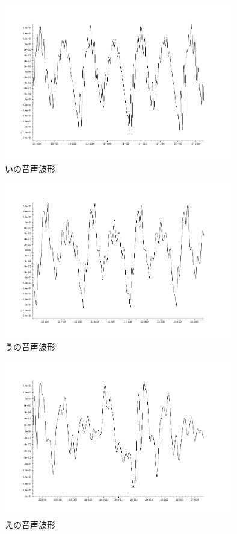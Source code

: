 \documentclass[12pt,oneside]{sotsuken_paper}
\begin{document}
\begin{figure}[htbp]
\begin{center}
\includegraphics[width=100mm]{img/i.png}
\caption{いの音声波形}
\label{fig:voice-i}
\end{center}
\end{figure}


\begin{figure}[htbp]
\begin{center}
\includegraphics[width=100mm]{img/u.png}
\caption{うの音声波形}
\label{fig:voice-u}
\end{center}
\end{figure}


\begin{figure}[htbp]
\begin{center}
\includegraphics[width=100mm]{img/e.png}
\caption{えの音声波形}
\label{fig:voice-e}
\end{center}
\end{figure}
\end{document}
